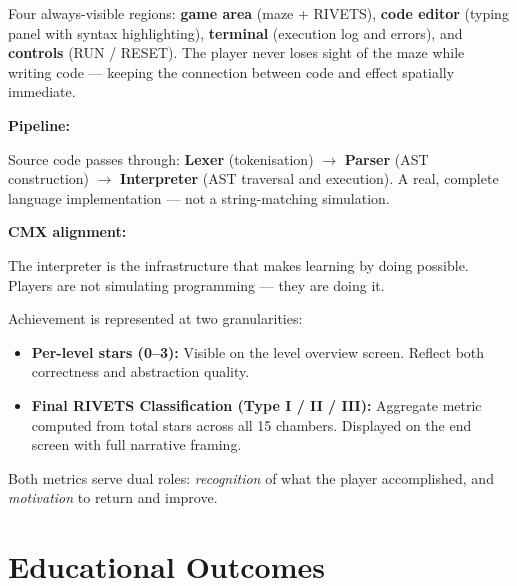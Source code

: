 \documentclass[12pt,a4paper]{article}
\newcommand{\gddfield}[2]{%
  \noindent\begin{minipage}[t]{3.5cm}\bfseries\color{accent}\sffamily#1\end{minipage}%
  \hspace{8pt}%
  \begin{minipage}[t]{\dimexpr\linewidth-3.5cm-8pt\relax}%
    #2
  \end{minipage}\par\smallskip}
\begin{document}
\begin{tcolorbox}[gddbox, title={User Interface}]
Four always-visible regions: \textbf{game area} (maze + RIVETS), \textbf{code editor} (typing panel with syntax highlighting), \textbf{terminal} (execution log and errors), and \textbf{controls} (RUN / RESET). The player never loses sight of the maze while writing code --- keeping the connection between code and effect spatially immediate.
\end{tcolorbox}

\vspace{4pt}

\begin{tcolorbox}[gddbox, title={Interpreter}]
\gddfield{Pipeline:}{Source code passes through: \textbf{Lexer} (tokenisation) $\rightarrow$ \textbf{Parser} (AST construction) $\rightarrow$ \textbf{Interpreter} (AST traversal and execution). A real, complete language implementation --- not a string-matching simulation.}
\gddfield{CMX alignment:}{The interpreter is the infrastructure that makes learning by doing possible. Players are not simulating programming --- they are doing it.}
\end{tcolorbox}

\vspace{4pt}

\begin{tcolorbox}[gddbox, title={Game Achievement}]
Achievement is represented at two granularities:
\begin{itemize}[noitemsep]
  \item \textbf{Per-level stars (0--3):} Visible on the level overview screen. Reflect both correctness and abstraction quality.
  \item \textbf{Final RIVETS Classification (Type I / II / III):} Aggregate metric computed from total stars across all 15 chambers. Displayed on the end screen with full narrative framing.
\end{itemize}
\vspace{4pt}
Both metrics serve dual roles: \emph{recognition} of what the player accomplished, and \emph{motivation} to return and improve.
\end{tcolorbox}


\section{Educational Outcomes}
\end{document}
